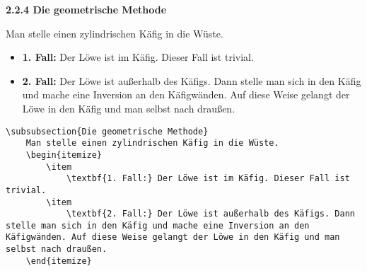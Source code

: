 \begin{frame}[fragile]
	\vspace{-0.2cm}
	\Losung
	\begin{outputbox}
		{\large\textbf{2.2.4 Die geometrische Methode}}
		
		Man stelle einen zylindrischen Käfig in die Wüste.
		\begin{itemize}
			\item
			\textbf{1. Fall:} Der Löwe ist im Käfig. Dieser Fall ist trivial.
			\item
			\textbf{2. Fall:} Der Löwe ist außerhalb des Käfigs. Dann stelle man sich in den Käfig und mache eine Inversion an den Käfigwänden. Auf diese Weise gelangt der Löwe in den Käfig und man selbst nach draußen.
		\end{itemize}
		\vspace{-0.2cm}
	\end{outputbox}

	\Code
	\vspace{-0.1cm}
	\begin{lstlisting}
\subsubsection{Die geometrische Methode}
	Man stelle einen zylindrischen Käfig in die Wüste.
	\begin{itemize}
		\item
			\textbf{1. Fall:} Der Löwe ist im Käfig. Dieser Fall ist trivial.
		\item
			\textbf{2. Fall:} Der Löwe ist außerhalb des Käfigs. Dann stelle man sich in den Käfig und mache eine Inversion an den Käfigwänden. Auf diese Weise gelangt der Löwe in den Käfig und man selbst nach draußen.
	\end{itemize}
	\end{lstlisting}
\end{frame}
